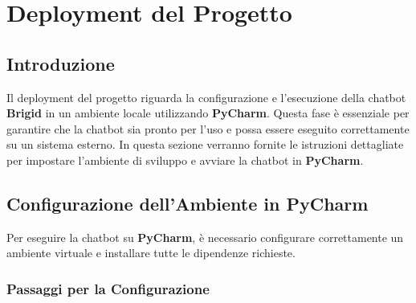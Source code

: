 \documentclass[12pt, letterpaper]{article}
\begin{document}
\section{Deployment del Progetto}

\subsection{Introduzione}
Il deployment del progetto riguarda la configurazione e l'esecuzione della chatbot \textbf{Brigid} in un ambiente locale utilizzando \textbf{PyCharm}. Questa fase è essenziale per garantire che la chatbot sia pronto per l'uso e possa essere eseguito correttamente su un sistema esterno.
In questa sezione verranno fornite le istruzioni dettagliate per impostare l'ambiente di sviluppo e avviare la chatbot in \textbf{PyCharm}.

\subsection{Configurazione dell'Ambiente in PyCharm}

Per eseguire la chatbot su \textbf{PyCharm}, è necessario configurare correttamente un ambiente virtuale e installare tutte le dipendenze richieste.

\subsubsection{Passaggi per la Configurazione}
\end{document}

